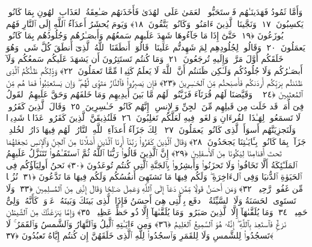  وَأَمَّا ثَمُودُ فَهَدَينَـٰهُم فَٱستَحَبُّوا۟ ٱلعَمَىٰ عَلَى ٱلهُدَىٰ فَأَخَذَتهُم صَـٰعِقَةُ ٱلعَذَابِ ٱلهُونِ بِمَا كَانُوا۟ يَكسِبُونَ ﴿١٧﴾
 وَنَجَّينَا ٱلَّذِينَ ءَامَنُوا۟ وَكَانُوا۟ يَتَّقُونَ ﴿١٨﴾
 وَيَومَ يُحشَرُ أَعدَآءُ ٱللَّهِ إِلَى ٱلنَّارِ فَهُم يُوزَعُونَ ﴿١٩﴾
 حَتَّىٰٓ إِذَا مَا جَآءُوهَا شَهِدَ عَلَيهِم سَمعُهُم وَأَبصَـٰرُهُم وَجُلُودُهُم بِمَا كَانُوا۟ يَعمَلُونَ ﴿٢٠﴾
 وَقَالُوا۟ لِجُلُودِهِم لِمَ شَهِدتُّم عَلَينَا ۖ قَالُوٓا۟ أَنطَقَنَا ٱللَّهُ ٱلَّذِىٓ أَنطَقَ كُلَّ شَىءٍۢ وَهُوَ خَلَقَكُم أَوَّلَ مَرَّةٍۢ وَإِلَيهِ تُرجَعُونَ ﴿٢١﴾
 وَمَا كُنتُم تَستَتِرُونَ أَن يَشهَدَ عَلَيكُم سَمعُكُم وَلَآ أَبصَـٰرُكُم وَلَا جُلُودُكُم وَلَـٰكِن ظَنَنتُم أَنَّ ٱللَّهَ لَا يَعلَمُ كَثِيرًۭا مِّمَّا تَعمَلُونَ ﴿٢٢﴾
 وَذَٟلِكُم ظَنُّكُمُ ٱلَّذِى ظَنَنتُم بِرَبِّكُم أَردَىٰكُم فَأَصبَحتُم مِّنَ ٱلخَـٰسِرِينَ ﴿٢٣﴾
 فَإِن يَصبِرُوا۟ فَٱلنَّارُ مَثوًۭى لَّهُم ۖ وَإِن يَستَعتِبُوا۟ فَمَا هُم مِّنَ ٱلمُعتَبِينَ ﴿٢٤﴾
 ۞ وَقَيَّضنَا لَهُم قُرَنَآءَ فَزَيَّنُوا۟ لَهُم مَّا بَينَ أَيدِيهِم وَمَا خَلفَهُم وَحَقَّ عَلَيهِمُ ٱلقَولُ فِىٓ أُمَمٍۢ قَد خَلَت مِن قَبلِهِم مِّنَ ٱلجِنِّ وَٱلإِنسِ ۖ إِنَّهُم كَانُوا۟ خَـٰسِرِينَ ﴿٢٥﴾
 وَقَالَ ٱلَّذِينَ كَفَرُوا۟ لَا تَسمَعُوا۟ لِهَـٰذَا ٱلقُرءَانِ وَٱلغَوا۟ فِيهِ لَعَلَّكُم تَغلِبُونَ ﴿٢٦﴾
 فَلَنُذِيقَنَّ ٱلَّذِينَ كَفَرُوا۟ عَذَابًۭا شَدِيدًۭا وَلَنَجزِيَنَّهُم أَسوَأَ ٱلَّذِى كَانُوا۟ يَعمَلُونَ ﴿٢٧﴾
 ذَٟلِكَ جَزَآءُ أَعدَآءِ ٱللَّهِ ٱلنَّارُ ۖ لَهُم فِيهَا دَارُ ٱلخُلدِ ۖ جَزَآءًۢ بِمَا كَانُوا۟ بِـَٔايَـٰتِنَا يَجحَدُونَ ﴿٢٨﴾
 وَقَالَ ٱلَّذِينَ كَفَرُوا۟ رَبَّنَآ أَرِنَا ٱلَّذَينِ أَضَلَّانَا مِنَ ٱلجِنِّ وَٱلإِنسِ نَجعَلهُمَا تَحتَ أَقدَامِنَا لِيَكُونَا مِنَ ٱلأَسفَلِينَ ﴿٢٩﴾
 إِنَّ ٱلَّذِينَ قَالُوا۟ رَبُّنَا ٱللَّهُ ثُمَّ ٱستَقَـٰمُوا۟ تَتَنَزَّلُ عَلَيهِمُ ٱلمَلَـٰٓئِكَةُ أَلَّا تَخَافُوا۟ وَلَا تَحزَنُوا۟ وَأَبشِرُوا۟ بِٱلجَنَّةِ ٱلَّتِى كُنتُم تُوعَدُونَ ﴿٣٠﴾
 نَحنُ أَولِيَآؤُكُم فِى ٱلحَيَوٰةِ ٱلدُّنيَا وَفِى ٱلءَاخِرَةِ ۖ وَلَكُم فِيهَا مَا تَشتَهِىٓ أَنفُسُكُم وَلَكُم فِيهَا مَا تَدَّعُونَ ﴿٣١﴾
 نُزُلًۭا مِّن غَفُورٍۢ رَّحِيمٍۢ ﴿٣٢﴾
 وَمَن أَحسَنُ قَولًۭا مِّمَّن دَعَآ إِلَى ٱللَّهِ وَعَمِلَ صَـٰلِحًۭا وَقَالَ إِنَّنِى مِنَ ٱلمُسلِمِينَ ﴿٣٣﴾
 وَلَا تَستَوِى ٱلحَسَنَةُ وَلَا ٱلسَّيِّئَةُ ۚ ٱدفَع بِٱلَّتِى هِىَ أَحسَنُ فَإِذَا ٱلَّذِى بَينَكَ وَبَينَهُۥ عَدَٟوَةٌۭ كَأَنَّهُۥ وَلِىٌّ حَمِيمٌۭ ﴿٣٤﴾
 وَمَا يُلَقَّىٰهَآ إِلَّا ٱلَّذِينَ صَبَرُوا۟ وَمَا يُلَقَّىٰهَآ إِلَّا ذُو حَظٍّ عَظِيمٍۢ ﴿٣٥﴾
 وَإِمَّا يَنزَغَنَّكَ مِنَ ٱلشَّيطَٰنِ نَزغٌۭ فَٱستَعِذ بِٱللَّهِ ۖ إِنَّهُۥ هُوَ ٱلسَّمِيعُ ٱلعَلِيمُ ﴿٣٦﴾
 وَمِن ءَايَـٰتِهِ ٱلَّيلُ وَٱلنَّهَارُ وَٱلشَّمسُ وَٱلقَمَرُ ۚ لَا تَسجُدُوا۟ لِلشَّمسِ وَلَا لِلقَمَرِ وَٱسجُدُوا۟ لِلَّهِ ٱلَّذِى خَلَقَهُنَّ إِن كُنتُم إِيَّاهُ تَعبُدُونَ ﴿٣٧﴾
